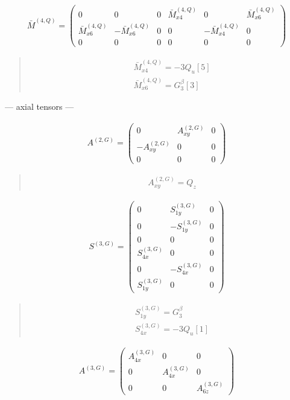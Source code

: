 \documentclass[fleqn,10pt]{jsarticle}
\begin{document}
\begin{align*}
\bar{M}^{(4,Q)} = \begin{pmatrix} 0 & 0 & 0 & \bar{M}^{(4,Q)}_{x4} & 0 & \bar{M}^{(4,Q)}_{x6} \\ \bar{M}^{(4,Q)}_{x6} & - \bar{M}^{(4,Q)}_{x6} & 0 & 0 & - \bar{M}^{(4,Q)}_{x4} & 0 \\ 0 & 0 & 0 & 0 & 0 & 0 \end{pmatrix}
\end{align*}
\begin{quote}
\begin{align*}
& \bar{M}^{(4,Q)}_{x4} = - 3 Q_{u}[5] \\
& \bar{M}^{(4,Q)}_{x6} = G_{3}^{\beta}[3]
\end{align*}
\end{quote}
\newpage
\begin{center}\LARGE --- axial tensors ---\end{center}
\begin{align*}
A^{(2,G)} = \begin{pmatrix} 0 & A^{(2,G)}_{xy} & 0 \\ - A^{(2,G)}_{xy} & 0 & 0 \\ 0 & 0 & 0 \end{pmatrix}
\end{align*}
\begin{quote}
\begin{align*}
& A^{(2,G)}_{xy} = Q_{z}
\end{align*}
\end{quote}
\begin{align*}
S^{(3,G)} = \begin{pmatrix} 0 & S^{(3,G)}_{1y} & 0 \\ 0 & - S^{(3,G)}_{1y} & 0 \\ 0 & 0 & 0 \\ S^{(3,G)}_{4x} & 0 & 0 \\ 0 & - S^{(3,G)}_{4x} & 0 \\ S^{(3,G)}_{1y} & 0 & 0 \end{pmatrix}
\end{align*}
\begin{quote}
\begin{align*}
& S^{(3,G)}_{1y} = G_{3}^{\beta} \\
& S^{(3,G)}_{4x} = - 3 Q_{u}[1]
\end{align*}
\end{quote}
\begin{align*}
A^{(3,G)} = \begin{pmatrix} A^{(3,G)}_{4x} & 0 & 0 \\ 0 & A^{(3,G)}_{4x} & 0 \\ 0 & 0 & A^{(3,G)}_{6z} \end{pmatrix}
\end{align*}
\end{document}
